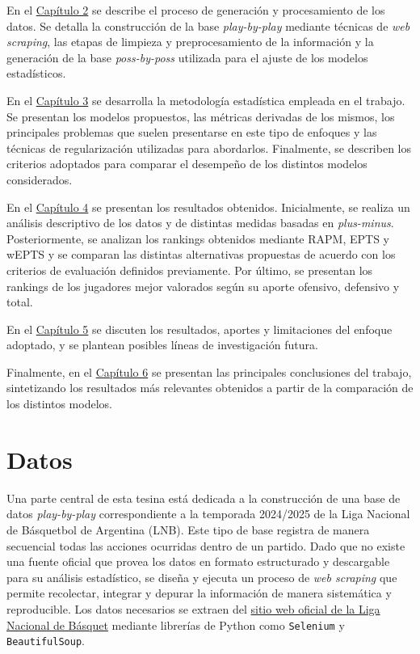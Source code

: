 \documentclass[
  12pt,
]{article}
\begin{document}
En el \hyperref[cap:datos]{Capítulo 2} se describe el proceso de
generación y procesamiento de los datos. Se detalla la construcción de
la base \emph{play-by-play} mediante técnicas de \emph{web scraping},
las etapas de limpieza y preprocesamiento de la información y la
generación de la base \emph{poss-by-poss} utilizada para el ajuste de
los modelos estadísticos.

En el \hyperref[cap:metodologia]{Capítulo 3} se desarrolla la
metodología estadística empleada en el trabajo. Se presentan los modelos
propuestos, las métricas derivadas de los mismos, los principales
problemas que suelen presentarse en este tipo de enfoques y las técnicas
de regularización utilizadas para abordarlos. Finalmente, se describen
los criterios adoptados para comparar el desempeño de los distintos
modelos considerados.

En el \hyperref[cap:resultados]{Capítulo 4} se presentan los resultados
obtenidos. Inicialmente, se realiza un análisis descriptivo de los datos
y de distintas medidas basadas en \emph{plus-minus}. Posteriormente, se
analizan los rankings obtenidos mediante RAPM, EPTS y wEPTS y se
comparan las distintas alternativas propuestas de acuerdo con los
criterios de evaluación definidos previamente. Por último, se presentan
los rankings de los jugadores mejor valorados según su aporte ofensivo,
defensivo y total.

En el \hyperref[cap:discusion]{Capítulo 5} se discuten los resultados,
aportes y limitaciones del enfoque adoptado, y se plantean posibles
líneas de investigación futura.

Finalmente, en el \hyperref[cap:conclusiones]{Capítulo 6} se presentan
las principales conclusiones del trabajo, sintetizando los resultados
más relevantes obtenidos a partir de la comparación de los distintos
modelos.

\newpage

\section{Datos}\label{cap:datos}

Una parte central de esta tesina está dedicada a la construcción de una
base de datos \emph{play-by-play} correspondiente a la temporada
2024/2025 de la Liga Nacional de Básquetbol de Argentina (LNB). Este
tipo de base registra de manera secuencial todas las acciones ocurridas
dentro de un partido. Dado que no existe una fuente oficial que provea
los datos en formato estructurado y descargable para su análisis
estadístico, se diseña y ejecuta un proceso de \emph{web scraping} que
permite recolectar, integrar y depurar la información de manera
sistemática y reproducible. Los datos necesarios se extraen del
\href{https://www.laliganacional.com.ar/laliga/}{sitio web oficial de la
Liga Nacional de Básquet} mediante librerías de Python como
\texttt{Selenium} y \texttt{BeautifulSoup}.
\end{document}
